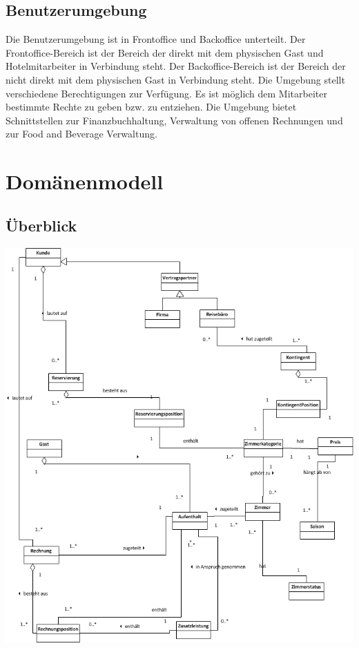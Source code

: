 \documentclass[10pt,a4paper,titlepage]{article}
\begin{document}
\subsection{Benutzerumgebung}
Die Benutzerumgebung ist in Frontoffice und Backoffice unterteilt. Der Frontoffice-Bereich ist der Bereich der direkt mit dem physischen Gast und Hotelmitarbeiter in Verbindung steht. Der Backoffice-Bereich ist der Bereich der nicht direkt mit dem physischen Gast in Verbindung steht. Die Umgebung stellt verschiedene Berechtigungen zur Verfügung. Es ist möglich dem Mitarbeiter bestimmte Rechte zu geben bzw. zu entziehen. Die Umgebung bietet Schnittstellen zur Finanzbuchhaltung, Verwaltung von offenen Rechnungen und zur Food and Beverage Verwaltung.

\section{Domänenmodell}
\subsection{Überblick}
\includegraphics[width=\linewidth]{Images/Domaenenmodell_Uebersicht.png}
\end{document}
